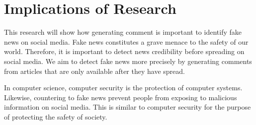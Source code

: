\section{Implications of Research}
This research will show how generating comment is important to identify fake news on social media.
Fake news constitutes a grave menace to the safety of our world.
Therefore, it is important to detect news credibility before spreading on social media.
We aim to detect fake news more precisely by generating comments from articles that are only available after they have spread.

In computer science, computer security is the protection of computer systems.
Likewise, countering to fake news prevent people from exposing to malicious information on social media.
This is similar to computer security for the purpose of protecting the safety of society.